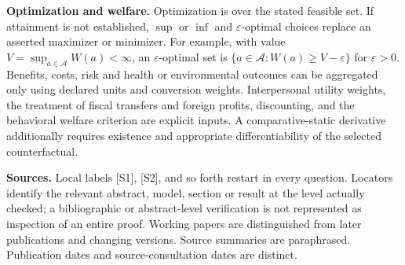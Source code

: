 \documentclass[11pt,a4paper]{article}
\begin{document}
\textbf{Optimization and welfare.} Optimization is over the stated feasible set. If attainment is not established, $\sup$ or $\inf$ and $\varepsilon$-optimal choices replace an asserted maximizer or minimizer. For example, with value $V=\sup_{a\in\mathcal A}W(a)<\infty$, an $\varepsilon$-optimal set is $\{a\in\mathcal A:W(a)\geq V-\varepsilon\}$ for $\varepsilon>0$. Benefits, costs, risk and health or environmental outcomes can be aggregated only using declared units and conversion weights. Interpersonal utility weights, the treatment of fiscal transfers and foreign profits, discounting, and the behavioral welfare criterion are explicit inputs. A comparative-static derivative additionally requires existence and appropriate differentiability of the selected counterfactual.

\textbf{Sources.} Local labels [S1], [S2], and so forth restart in every question. Locators identify the relevant abstract, model, section or result at the level actually checked; a bibliographic or abstract-level verification is not represented as inspection of an entire proof. Working papers are distinguished from later publications and changing versions. Source summaries are paraphrased. Publication dates and source-consultation dates are distinct.
\end{document}
